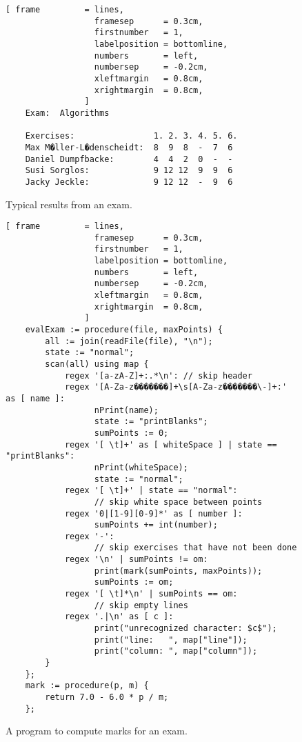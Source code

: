 \begin{figure}[!ht]
\centering
\begin{Verbatim}[ frame         = lines, 
                  framesep      = 0.3cm, 
                  firstnumber   = 1,
                  labelposition = bottomline,
                  numbers       = left,
                  numbersep     = -0.2cm,
                  xleftmargin   = 0.8cm,
                  xrightmargin  = 0.8cm,
                ]
    Exam:  Algorithms
    
    Exercises:                1. 2. 3. 4. 5. 6.
    Max M�ller-L�denscheidt:  8  9  8  -  7  6
    Daniel Dumpfbacke:        4  4  2  0  -  -
    Susi Sorglos:             9 12 12  9  9  6
    Jacky Jeckle:             9 12 12  -  9  6
\end{Verbatim}
\vspace*{-0.3cm}
\caption{Typical results from an exam.}
\label{fig:result.txt}
\end{figure}


\begin{figure}[!ht]
\centering
\begin{Verbatim}[ frame         = lines, 
                  framesep      = 0.3cm, 
                  firstnumber   = 1,
                  labelposition = bottomline,
                  numbers       = left,
                  numbersep     = -0.2cm,
                  xleftmargin   = 0.8cm,
                  xrightmargin  = 0.8cm,
                ]
    evalExam := procedure(file, maxPoints) {
        all := join(readFile(file), "\n");
        state := "normal";
        scan(all) using map {
            regex '[a-zA-Z]+:.*\n': // skip header
            regex '[A-Za-z�������]+\s[A-Za-z�������\-]+:' as [ name ]:
                  nPrint(name);
                  state := "printBlanks";
                  sumPoints := 0;
            regex '[ \t]+' as [ whiteSpace ] | state == "printBlanks":
                  nPrint(whiteSpace);  
                  state := "normal";
            regex '[ \t]+' | state == "normal": 
                  // skip white space between points
            regex '0|[1-9][0-9]*' as [ number ]:
                  sumPoints += int(number);
            regex '-': 
                  // skip exercises that have not been done  
            regex '\n' | sumPoints != om:
                  print(mark(sumPoints, maxPoints));
                  sumPoints := om;
            regex '[ \t]*\n' | sumPoints == om:
                  // skip empty lines
            regex '.|\n' as [ c ]:
                  print("unrecognized character: $c$");
                  print("line:   ", map["line"]);
                  print("column: ", map["column"]);
        }
    };
    mark := procedure(p, m) {
        return 7.0 - 6.0 * p / m;
    };    
\end{Verbatim}
\vspace*{-0.3cm}
\caption{A program to compute marks for an exam.}
\label{fig:exam.stlx}
\end{figure}

